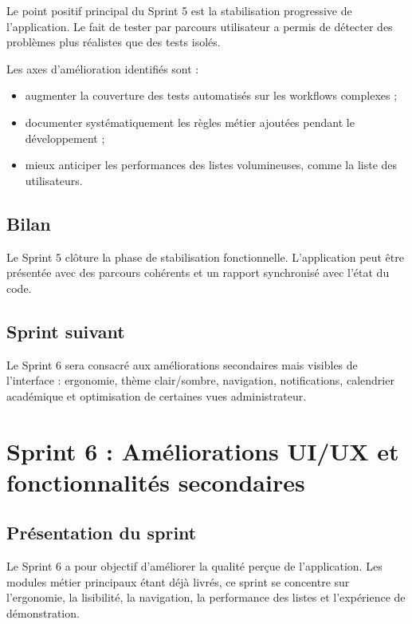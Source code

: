 \documentclass[12pt,a4paper]{report}
\begin{document}
Le point positif principal du Sprint 5 est la stabilisation progressive de l'application. Le fait de tester par parcours utilisateur a permis de détecter des problèmes plus réalistes que des tests isolés.

Les axes d'amélioration identifiés sont :

\begin{itemize}[itemsep=0.4em]
    \item augmenter la couverture des tests automatisés sur les workflows complexes ;
    \item documenter systématiquement les règles métier ajoutées pendant le développement ;
    \item mieux anticiper les performances des listes volumineuses, comme la liste des utilisateurs.
\end{itemize}

\section{Bilan}

Le Sprint 5 clôture la phase de stabilisation fonctionnelle. L'application peut être présentée avec des parcours cohérents et un rapport synchronisé avec l'état du code.

\section{Sprint suivant}

Le Sprint 6 sera consacré aux améliorations secondaires mais visibles de l'interface : ergonomie, thème clair/sombre, navigation, notifications, calendrier académique et optimisation de certaines vues administrateur.

\chapter{Sprint 6 : Améliorations UI/UX et fonctionnalités secondaires}

\section{Présentation du sprint}

Le Sprint 6 a pour objectif d'améliorer la qualité perçue de l'application. Les modules métier principaux étant déjà livrés, ce sprint se concentre sur l'ergonomie, la lisibilité, la navigation, la performance des listes et l'expérience de démonstration.
\end{document}
